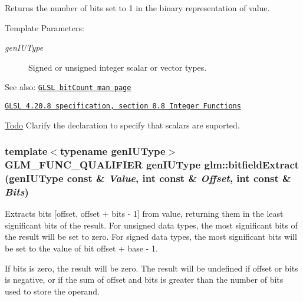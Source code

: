 Returns the number of bits set to 1 in the binary representation of value.

\begin{Desc}
\item[Template Parameters:]
\begin{description}
\item[{\em genIUType}]Signed or unsigned integer scalar or vector types.\end{description}
\end{Desc}
\begin{Desc}
\item[See also:]\href{http://www.opengl.org/sdk/docs/manglsl/xhtml/bitCount.xml}{\tt GLSL bitCount man page} 

\href{http://www.opengl.org/registry/doc/GLSLangSpec.4.20.8.pdf}{\tt GLSL 4.20.8 specification, section 8.8 Integer Functions}\end{Desc}
\begin{Desc}
\item[\hyperlink{todo__todo000045}{Todo}]Clarify the declaration to specify that scalars are suported. \end{Desc}
\hypertarget{group__core__func__integer_gcd29b1963983f03da4de38aaffac6dbd}{
\subsubsection[bitfieldExtract]{\setlength{\rightskip}{0pt plus 5cm}template$<$typename genIUType$>$ GLM\_\-FUNC\_\-QUALIFIER genIUType glm::bitfieldExtract (genIUType const \& {\em Value}, \/  int const \& {\em Offset}, \/  int const \& {\em Bits})}}
\label{group__core__func__integer_gcd29b1963983f03da4de38aaffac6dbd}


Extracts bits \mbox{[}offset, offset + bits - 1\mbox{]} from value, returning them in the least significant bits of the result. For unsigned data types, the most significant bits of the result will be set to zero. For signed data types, the most significant bits will be set to the value of bit offset + base - 1.

If bits is zero, the result will be zero. The result will be undefined if offset or bits is negative, or if the sum of offset and bits is greater than the number of bits used to store the operand.

